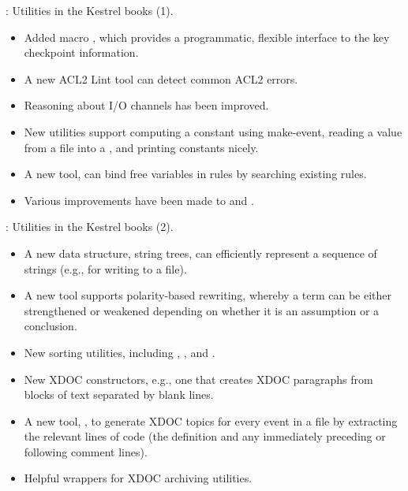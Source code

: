 \begin{frame}

\implibtitle

:
Utilities in the Kestrel books (1).
\begin{itemize}
\item Added macro ,
  which provides a programmatic, flexible interface
  to the key checkpoint information.
\item A new ACL2 Lint tool can detect common ACL2 errors.
\item Reasoning about I/O channels has been improved.
\item New utilities support computing a constant using make-event,
  reading a value from a file into a , and printing constants
  nicely.
\item A new tool,  can bind free variables in rules by
  searching existing rules.
\item Various improvements have been made to  and
  .
\end{itemize}

\end{frame}


\begin{frame}

\implibtitle

:
Utilities in the Kestrel books (2).
\begin{itemize}
\item A new data structure, string trees, can efficiently represent a
  sequence of strings (e.g., for writing to a file).
\item A new tool supports polarity-based rewriting, whereby a term can
  be either strengthened or weakened depending on whether it is an
  assumption or a conclusion.
\item New sorting utilities, including ,
  , and .
\item New XDOC constructors, e.g., one that creates XDOC paragraphs
  from blocks of text separated by blank lines.
\item A new tool, , to generate XDOC topics
  for every event in a file by extracting the relevant lines of code
  (the definition and any immediately preceding or following comment
  lines).
\item Helpful wrappers for XDOC archiving utilities.
\end{itemize}

\end{frame}

